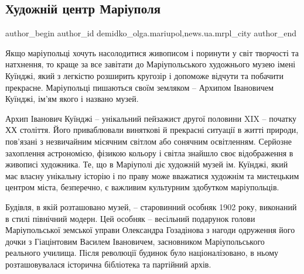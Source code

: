  
 
 
 
 
 
\subsection{Художній центр Маріуполя}
\label{sec:27_02_2018.stz.news.ua.mrpl_city.1.hudozhnii_centr_mariupolja}
 
\ifcmt
 author_begin
   author_id demidko_olga.mariupol,news.ua.mrpl_city
 author_end
\fi

Якщо маріупольці хочуть насолодитися живописом і поринути у світ творчості та
натхнення, то краще за все завітати до Маріупольського художнього музею імені
Куїнджі, який з легкістю розширить кругозір і допоможе відчути та побачити
прекрасне. Маріупольці пишаються своїм земляком – Архипом Івановичем Куїнджі,
ім'ям якого і названо музей.


Архип Іванович Куїнджі – унікальний пейзажист другої половини XIX – початку ХХ
століття. Його приваблювали виняткові й прекрасні ситуації в житті природи,
пов’язані з незвичайним місячним світлом або сонячним освітленням. Серйозне
захоплення астрономією, фізикою кольору і світла знайшло своє відображення в
живописі художника. Те, що в Маріуполі діє художній музей ім. Куїнджі, який має
власну унікальну історію і по праву може вважатися художнім та мистецьким
центром міста, безперечно, є важливим культурним здобутком маріупольців.


Будівля, в якій розташовано музей, – старовинний особняк 1902 року, виконаний
в стилі північний модерн. Цей особняк – весільний подарунок голови
Маріупольської земської управи Олександра Гозадінова з нагоди одруження його
дочки з Гіацінтовим Василем Івановичем, засновником Маріупольського реального
училища. Після революції будинок було націоналізовано, в ньому розташовувалася
історична бібліотека та партійний архів.

